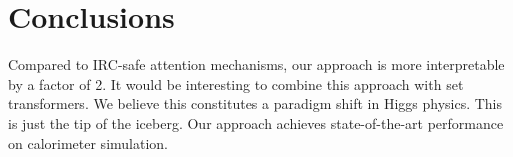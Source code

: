 \section{Conclusions}\label{sec:conclusions}

Compared to IRC-safe attention mechanisms, our approach is more
interpretable by a factor of 2. It would be interesting to combine this
approach with set transformers. We believe this constitutes a paradigm
shift in Higgs physics. This is just the tip of the iceberg. Our
approach achieves state-of-the-art performance on calorimeter
simulation.

